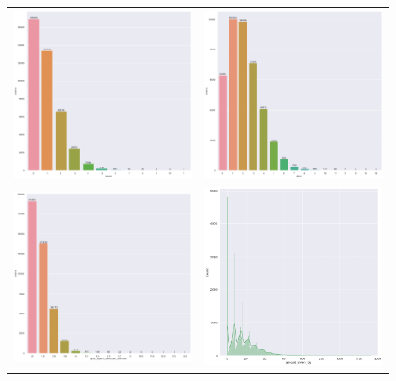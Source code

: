 \begin{figure}[H]
    \centering
    \begin{tabular}{cc}
        \includegraphics[width=0.5\linewidth]{res/imgs/plots/saves.png} &
        \includegraphics[width=0.5\linewidth]{res/imgs/plots/shots.png} \\
        \includegraphics[width=0.5\linewidth]{res/imgs/plots/goal_against.png} &
        \includegraphics[width=0.5\linewidth]{res/imgs/plots/stolen_big.png} \\

\end{tabular}
\end{figure}
